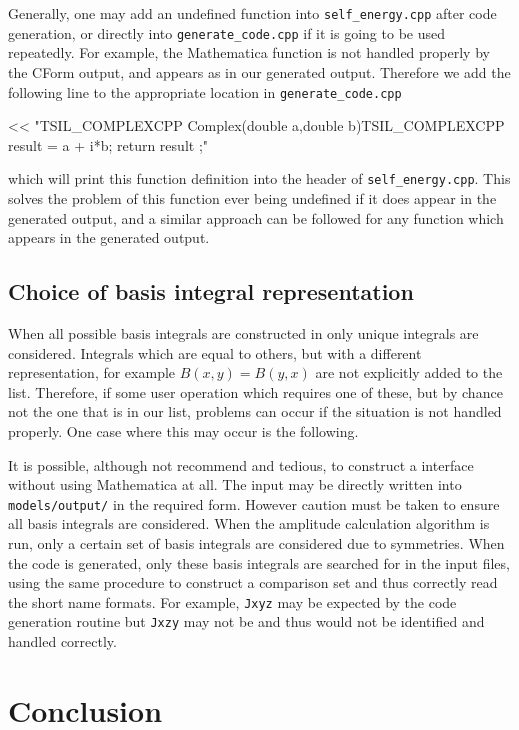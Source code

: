 Generally, one may add an undefined function into \lstinline{self_energy.cpp} after code generation, or directly into \lstinline{generate_code.cpp} if it is going to be used repeatedly.  For example, the Mathematica function  is not handled properly by the CForm output, and appears as  in our generated output.  Therefore we add the following line to the appropriate location in \lstinline{generate_code.cpp} 
\begin{lstterm}
<< "TSIL_COMPLEXCPP Complex(double a,double b){TSIL_COMPLEXCPP result = a + i*b; return result ;}\n"
\end{lstterm}
which will print this function definition into the header of \lstinline{self_energy.cpp}.  This solves the problem of this function ever being undefined if it does appear in the generated output, and a similar approach can be followed for any function which appears in the generated output.

\subsection{Choice of basis integral representation}

When all possible basis integrals are constructed in \mb only unique integrals are considered.  Integrals which are equal to others, but with a different representation, for example $B(x,y) = B(y,x)$ are not explicitly added to the list.  Therefore, if some user operation which requires one of these, but by chance not the one that is in our list, problems can occur if the situation is not handled properly.  One case where this may occur is the following.

It is possible, although not recommend and tedious, to construct a \tsil interface without using Mathematica at all.  The input may be directly written into \lstinline{models/output/} in the required form.  However caution must be taken to ensure all basis integrals are considered.  When the amplitude calculation algorithm is run, only a certain set of basis integrals are considered due to symmetries.  When the code is generated, only these basis integrals are searched for in the input files, using the same procedure to construct a comparison set and thus correctly read the short name formats.  For example, \lstinline{Jxyz} may be expected by the code generation routine but \lstinline{Jxzy} may not be and thus would not be identified and handled correctly.



\section{Conclusion}

